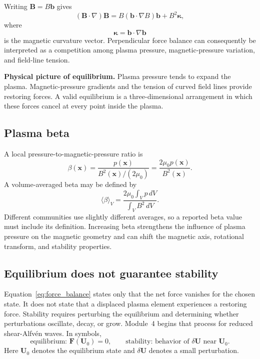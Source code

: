 Writing $\mathbf B=B\mathbf b$ gives
\begin{equation}
(\mathbf B\cdot\nabla)\mathbf B
=B(\mathbf b\cdot\nabla B)\mathbf b+B^2\boldsymbol\kappa,
\end{equation}
where
\begin{equation}
\boldsymbol\kappa=\mathbf b\cdot\nabla\mathbf b
\label{eq:curvature}
\end{equation}
is the magnetic curvature vector. Perpendicular force balance can consequently be interpreted as a competition among plasma pressure, magnetic-pressure variation, and field-line tension.

\begin{physicsbox}
\textbf{Physical picture of equilibrium.} Plasma pressure tends to expand the plasma. Magnetic-pressure gradients and the tension of curved field lines provide restoring forces. A valid equilibrium is a three-dimensional arrangement in which these forces cancel at every point inside the plasma.
\end{physicsbox}

\subsection{Plasma beta}
A local pressure-to-magnetic-pressure ratio is
\begin{equation}
\beta(\mathbf x)=\frac{p(\mathbf x)}{B^2(\mathbf x)/(2\mu_0)}
=\frac{2\mu_0p(\mathbf x)}{B^2(\mathbf x)}.
\label{eq:local_beta}
\end{equation}
A volume-averaged beta may be defined by
\begin{equation}
\langle\beta\rangle_V
=\frac{2\mu_0\int_V p\,dV}{\int_V B^2\,dV}.
\label{eq:volume_beta}
\end{equation}
Different communities use slightly different averages, so a reported beta value must include its definition. Increasing beta strengthens the influence of plasma pressure on the magnetic geometry and can shift the magnetic axis, rotational transform, and stability properties.

\subsection{Equilibrium does not guarantee stability}
Equation~\eqref{eq:force_balance} states only that the net force vanishes for the chosen state. It does not state that a displaced plasma element experiences a restoring force. Stability requires perturbing the equilibrium and determining whether perturbations oscillate, decay, or grow. Module~4 begins that process for reduced shear-Alfv\'en waves. In symbols,
\begin{equation}
\text{equilibrium: }\mathbf F(\mathbf U_0)=0,
\qquad
\text{stability: behavior of }\delta\mathbf U\text{ near }\mathbf U_0.
\end{equation}
Here $\mathbf U_0$ denotes the equilibrium state and $\delta\mathbf U$ denotes a small perturbation.

